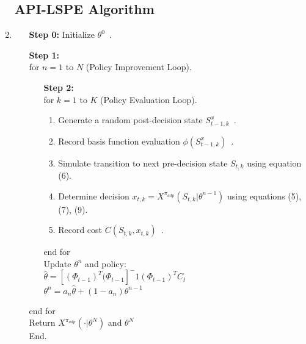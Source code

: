 \documentclass[12pt]{article} %
\begin{document}
\begin{enumerate}
    \subsection*{API-LSPE Algorithm}
    \hline
    \item \begin{center}
        \begin{enumerate}
            \item[\textbf{Step 0:}] Initialize $\theta^0$\ .
            \item[\textbf{Step 1:}]\ \\
                for $n = 1$ to $N$ (Policy Improvement Loop).\\
                \begin{enumerate}
                    \item[\textbf{Step 2:}]\ \\for $k=1$ to $K$ (Policy Evaluation Loop).
                \begin{enumerate}
                    \item Generate a random post-decision state $S_{t-1,k}^x$\ .
                    \item Record basis function evaluation $\phi(S_{t-1,k}^x)$\ .
                    \item Simulate transition to next pre-decision state $S_{t,k}$ using equation (6).
                    \item Determine decision $x_{t, k} = X^{\pi_{adp}}(S_{t,k} | \theta^{n-1})$ using equations (5), (7), (9).
                    \item Record cost $C(S_{t,k}, x_{t,k})$\ .
                \end{enumerate}
                end for\\
                Update $\theta^n$ and policy:
            \\$\hat{\theta} = [(\Phi_{t-1})^T(\Phi_{t-1}]^-1(\Phi_{t-1})^TC_t$\\$\theta^n=a_n\hat{\theta}+(1-a_n)\theta^{n-1}$
                \end{enumerate}
            end for\\
            Return $X^{\pi_{adp}}(\cdot|\theta^N)$ and $\theta^N$\\
            End.
        \end{enumerate}
    \end{center}

\end{enumerate}
\end{document}

